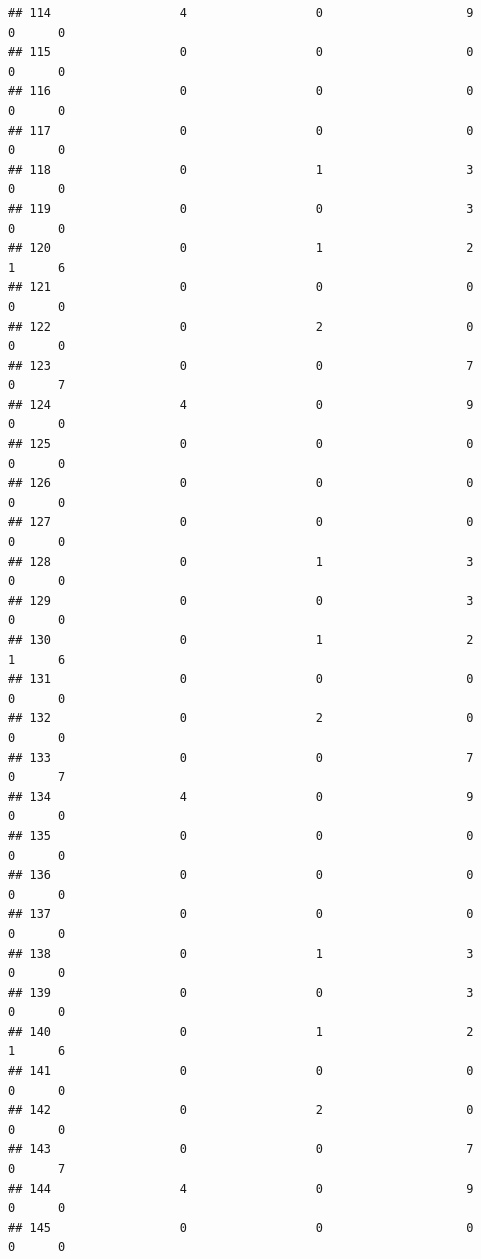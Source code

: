 \documentclass[
]{article}
\begin{document}
\begin{verbatim}
## 114                  4                  0                    9        0      0
## 115                  0                  0                    0        0      0
## 116                  0                  0                    0        0      0
## 117                  0                  0                    0        0      0
## 118                  0                  1                    3        0      0
## 119                  0                  0                    3        0      0
## 120                  0                  1                    2        1      6
## 121                  0                  0                    0        0      0
## 122                  0                  2                    0        0      0
## 123                  0                  0                    7        0      7
## 124                  4                  0                    9        0      0
## 125                  0                  0                    0        0      0
## 126                  0                  0                    0        0      0
## 127                  0                  0                    0        0      0
## 128                  0                  1                    3        0      0
## 129                  0                  0                    3        0      0
## 130                  0                  1                    2        1      6
## 131                  0                  0                    0        0      0
## 132                  0                  2                    0        0      0
## 133                  0                  0                    7        0      7
## 134                  4                  0                    9        0      0
## 135                  0                  0                    0        0      0
## 136                  0                  0                    0        0      0
## 137                  0                  0                    0        0      0
## 138                  0                  1                    3        0      0
## 139                  0                  0                    3        0      0
## 140                  0                  1                    2        1      6
## 141                  0                  0                    0        0      0
## 142                  0                  2                    0        0      0
## 143                  0                  0                    7        0      7
## 144                  4                  0                    9        0      0
## 145                  0                  0                    0        0      0

\end{verbatim}
\end{document}
